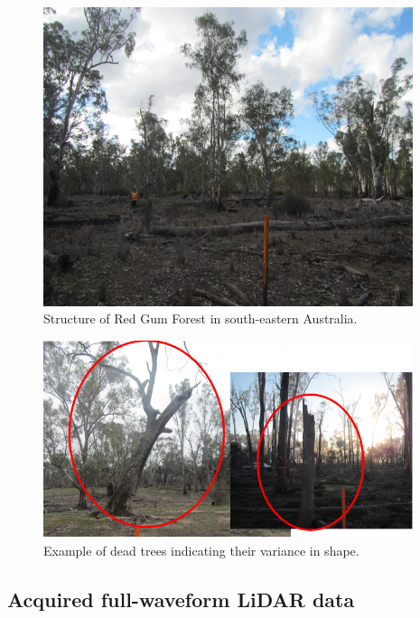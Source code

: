 \documentclass{subfiles}
\begin{document}
	\begin{figure} [h!]
		\centering
		\includegraphics[width=0.965\textwidth]{img/dead/Eucalyptus.png}
		\caption{Structure of Red Gum Forest in south-eastern Australia.}
		\label{fig:EucalyptusSize}
	\end{figure}

	\begin{figure} [h!]
		\centering
		\includegraphics[width=0.965\textwidth]{img/dead/DeadTreesExamplePhotos}
		\caption{Example of dead trees indicating their variance in shape.}
		\label{fig:DeadTreesExamplePhotos}
	\end{figure}

\subsection{Acquired full-waveform LiDAR data}\label{sec:AcquiredData}
\end{document}
